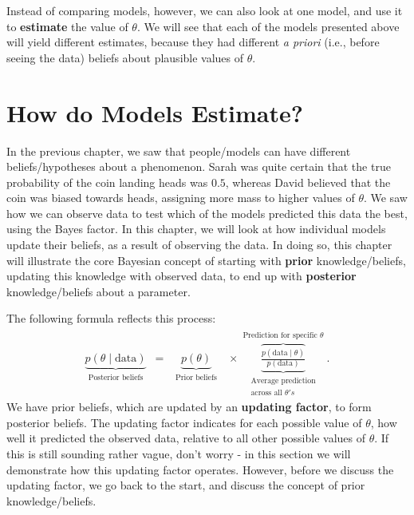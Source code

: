 \documentclass[
]{book}
\begin{document}
Instead of comparing models, however, we can also look at one model, and use it to \textbf{estimate} the value of \(\theta\). We will see that each of the models presented above will yield different estimates, because they had different \emph{a priori} (i.e., before seeing the data) beliefs about plausible values of \(\theta\).

\hypertarget{model-estimation-section}{%
\chapter{How do Models Estimate?}\label{model-estimation-section}}

In the previous chapter, we saw that people/models can have different beliefs/hypotheses about a phenomenon. Sarah was quite certain that the true probability of the coin landing heads was \(0.5\), whereas David believed that the coin was biased towards heads, assigning more mass to higher values of \(\theta\). We saw how we can observe data to test which of the models predicted this data the best, using the Bayes factor. In this chapter, we will look at how individual models update their beliefs, as a result of observing the data. In doing so, this chapter will illustrate the core Bayesian concept of starting with \textbf{prior} knowledge/beliefs, updating this knowledge with observed data, to end up with \textbf{posterior} knowledge/beliefs about a parameter.

The following formula reflects this process:
\begin{align}
\label{eq:BinomialEstimation}
\underbrace{ p(\theta \mid \text{data})}_{\substack{\text{Posterior beliefs}}} \,\,\, = \,\,\,
\underbrace{ p(\theta)}_{\substack{\text{Prior beliefs} }}
\,\,\,\, \times
\overbrace{\underbrace{\frac{p( \text{data} \mid \theta)}{p( \text{data})}}}^{\substack{\text{Prediction for specific }\theta }}_{\substack{\text{Average prediction} \\\text{across all }  \theta's}}.
\end{align}
We have prior beliefs, which are updated by an \textbf{updating factor}, to form posterior beliefs. The updating factor indicates for each possible value of \(\theta\), how well it predicted the observed data, relative to all other possible values of \(\theta\). If this is still sounding rather vague, don't worry - in this section we will demonstrate how this updating factor operates. However, before we discuss the updating factor, we go back to the start, and discuss the concept of prior knowledge/beliefs.
\end{document}

